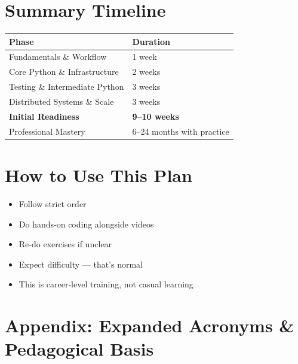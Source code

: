 \documentclass[12pt]{article}
\begin{document}
	\newpage
	
	\section*{ Summary Timeline}
	
	\begin{tabularx}{\textwidth}{|l|X|}
		\hline
		\textbf{Phase} & \textbf{Duration} \\
		\hline
		Fundamentals \& Workflow & 1 week \\
		\hline
		Core Python \& Infrastructure & 2 weeks \\
		\hline
		Testing \& Intermediate Python & 3 weeks \\
		\hline
		Distributed Systems \& Scale & 3 weeks \\
		\hline
		\textbf{Initial Readiness} & \textbf{\~9–10 weeks} \\
		\hline
		Professional Mastery & 6–24 months with practice \\
		\hline
	\end{tabularx}
	
	\vspace{0.5cm}
	
	\section*{How to Use This Plan}
	\begin{itemize}
		\item Follow strict order
		\item Do hands‑on coding alongside videos
		\item Re‑do exercises if unclear
		\item Expect difficulty — that’s normal
		\item This is career‑level training, not casual learning
	\end{itemize}
	
	\newpage
	
	\section*{Appendix: Expanded Acronyms \& Pedagogical Basis}
	
\end{document}
